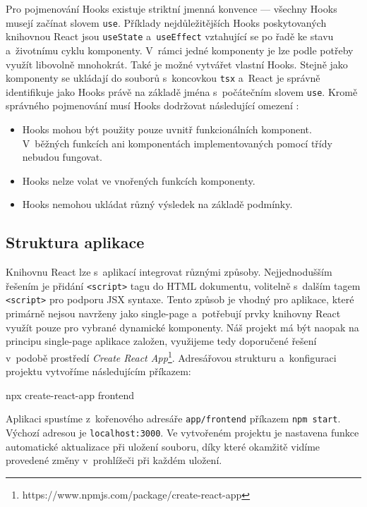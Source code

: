 Pro pojmenování Hooks existuje striktní jmenná konvence --- všechny Hooks musejí začínat slovem \texttt{use}. Příklady nejdůležitějších Hooks poskytovaných knihovnou React jsou \texttt{useState} a~\texttt{useEffect} vztahující se po řadě ke stavu a~životnímu cyklu komponenty. V~rámci jedné komponenty je lze podle potřeby využít libovolně mnohokrát. Také je možné vytvářet vlastní Hooks. Stejně jako komponenty se ukládají do souborů s~koncovkou \texttt{tsx} a~React je správně identifikuje jako Hooks právě na základě jména s~počátečním slovem \texttt{use}. Kromě správného pojmenování musí Hooks dodržovat následující omezení \citep{react-hooks-w3c}:
\begin{itemize}
    \item Hooks mohou být použity pouze uvnitř funkcionálních komponent. V~běžných funkcích ani komponentách implementovaných pomocí třídy nebudou fungovat.
    \item Hooks nelze volat ve vnořených funkcích komponenty.
    \item Hooks nemohou ukládat různý výsledek na základě podmínky.
\end{itemize}
 
\subsection{Struktura aplikace}

Knihovnu React lze s~aplikací integrovat různými způsoby. Nejjednodušším řešením je přidání \texttt{<script>} tagu do HTML dokumentu, volitelně s~dalším tagem \texttt{<script>} pro podporu JSX syntaxe. Tento způsob je vhodný pro aplikace, které primárně nejsou navrženy jako single-page a~potřebují prvky knihovny React využít pouze pro vybrané dynamické komponenty. Náš projekt má být naopak na principu single-page aplikace založen, využijeme tedy doporučené řešení v~podobě prostředí \emph{Create React App}\footnote{https://www.npmjs.com/package/create-react-app}. Adresářovou strukturu a~konfiguraci projektu vytvoříme následujícím příkazem:
\begin{code}
npx create-react-app frontend
\end{code}

Aplikaci spustíme z~kořenového adresáře \texttt{app/frontend} příkazem \texttt{npm\,start}. Výchozí adresou je \texttt{localhost:3000}. Ve vytvořeném projektu je nastavena funkce automatické aktualizace při uložení souboru, díky které okamžitě vidíme provedené změny v~prohlížeči při každém uložení.

